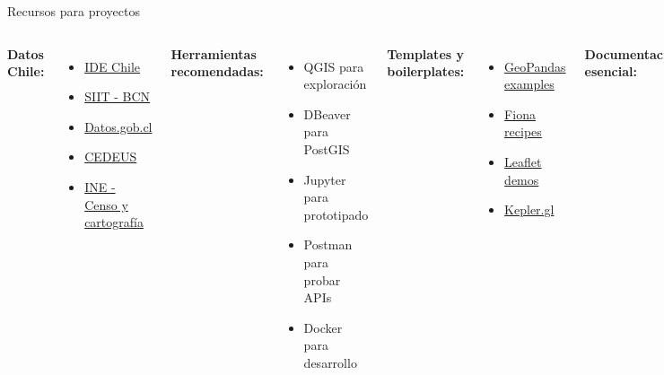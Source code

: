\documentclass[10pt,aspectratio=169]{beamer}
\begin{document}
\begin{frame}{Recursos para proyectos}
    \begin{columns}[T]
        \textbf{Datos Chile:}
        \begin{itemize}
            \item \href{https://www.ide.cl}{IDE Chile}
            \item \href{https://www.bcn.cl/siit}{SIIT - BCN}
            \item \href{https://datos.gob.cl}{Datos.gob.cl}
            \item \href{http://datos.cedeus.cl}{CEDEUS}
            \item \href{https://www.ine.cl}{INE - Censo y cartografía}
        \end{itemize}
        
        \vspace{0.3cm}
        \textbf{Herramientas recomendadas:}
        \begin{itemize}
            \item QGIS para exploración
            \item DBeaver para PostGIS
            \item Jupyter para prototipado
            \item Postman para probar APIs
            \item Docker para desarrollo
        \end{itemize}
        
        \textbf{Templates y boilerplates:}
        \begin{itemize}
            \item \href{https://github.com/geopandas/geopandas}{GeoPandas examples}
            \item \href{https://github.com/Toblerity/Fiona}{Fiona recipes}
            \item \href{https://github.com/Leaflet/Leaflet}{Leaflet demos}
            \item \href{https://github.com/uber/kepler.gl}{Kepler.gl}
        \end{itemize}
        
        \vspace{0.3cm}
        \textbf{Documentación esencial:}
        \begin{itemize}
            \item PostGIS.net
            \item GeoPandas.org
            \item OSMnx documentation
            \item Shapely manual
            \item GDAL/OGR cookbook
        \end{itemize}
    \end{columns}
\end{frame}
\end{document}
